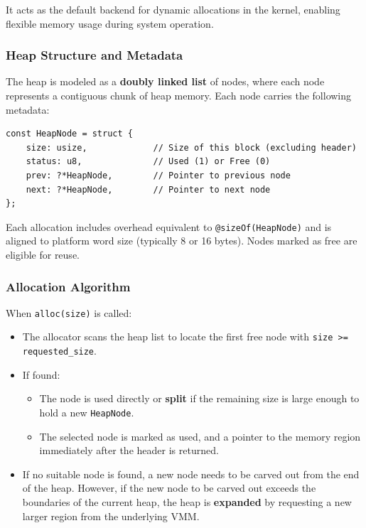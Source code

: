 \documentclass[12pt]{extarticle}
\begin{document}
It acts as the default backend for dynamic allocations in the kernel, enabling flexible memory usage during system operation.

\subsubsection*{Heap Structure and Metadata}

The heap is modeled as a \textbf{doubly linked list} of nodes, where each node represents a contiguous chunk of heap memory. Each node carries the following metadata:

\begin{lstlisting}[breaklines=true, basicstyle=\ttfamily\footnotesize]
const HeapNode = struct {
    size: usize,             // Size of this block (excluding header)
    status: u8,              // Used (1) or Free (0)
    prev: ?*HeapNode,        // Pointer to previous node
    next: ?*HeapNode,        // Pointer to next node
};
\end{lstlisting}

Each allocation includes overhead equivalent to \texttt{@sizeOf(HeapNode)} and is aligned to platform word size (typically 8 or 16 bytes). Nodes marked as free are eligible for reuse.

\subsubsection*{Allocation Algorithm}

When \texttt{alloc(size)} is called:

\begin{itemize}
    \item The allocator scans the heap list to locate the first free node with \texttt{size >= requested\_size}.
    \item If found:
    \begin{itemize}
        \item The node is used directly or \textbf{split} if the remaining size is large enough to hold a new \texttt{HeapNode}.
        \item The selected node is marked as used, and a pointer to the memory region immediately after the header is returned.
    \end{itemize}
    \item If no suitable node is found, a new node needs to be carved out from the end of the heap. However, if the new node to be carved out exceeds the boundaries of the current heap, the heap is \textbf{expanded} by requesting a new larger region from the underlying VMM.
\end{itemize}
\end{document}
